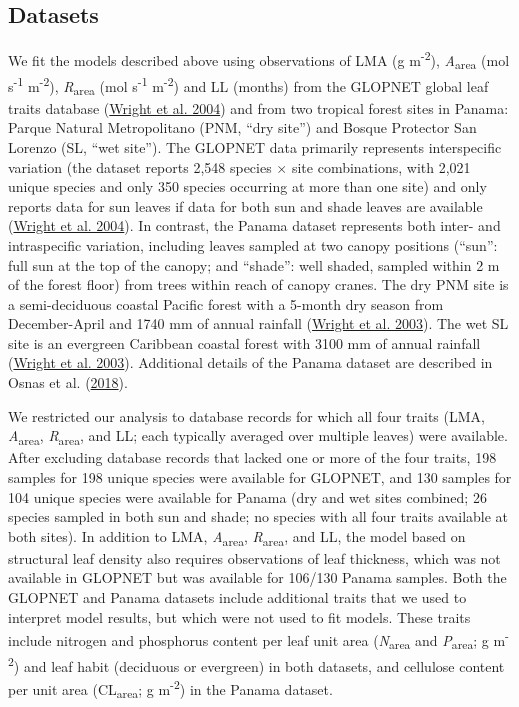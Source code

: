 \documentclass[
  12pt,
  letterpaper,
  DIV=11,
  numbers=noendperiod]{scrartcl}
\begin{document}
\hypertarget{datasets}{%
\subsection{Datasets}\label{datasets}}

We fit the models described above using observations of LMA (g
m\textsuperscript{-2}), \emph{A}\textsubscript{area} (mol
s\textsuperscript{-1} m\textsuperscript{-2}),
\emph{R}\textsubscript{area} (mol s\textsuperscript{-1}
m\textsuperscript{-2}) and LL (months) from the GLOPNET global leaf
traits database (\protect\hyperlink{ref-Wright2004a}{Wright et al.
2004}) and from two tropical forest sites in Panama: Parque Natural
Metropolitano (PNM, ``dry site'') and Bosque Protector San Lorenzo (SL,
``wet site''). The GLOPNET data primarily represents interspecific
variation (the dataset reports 2,548 species \(\times\) site
combinations, with 2,021 unique species and only 350 species occurring
at more than one site) and only reports data for sun leaves if data for
both sun and shade leaves are available
(\protect\hyperlink{ref-Wright2004a}{Wright et al. 2004}). In contrast,
the Panama dataset represents both inter- and intraspecific variation,
including leaves sampled at two canopy positions (``sun'': full sun at
the top of the canopy; and ``shade'': well shaded, sampled within 2 m of
the forest floor) from trees within reach of canopy cranes. The dry PNM
site is a semi-deciduous coastal Pacific forest with a 5-month dry
season from December-April and 1740 mm of annual rainfall
(\protect\hyperlink{ref-Wright2003}{Wright et al. 2003}). The wet SL
site is an evergreen Caribbean coastal forest with 3100 mm of annual
rainfall (\protect\hyperlink{ref-Wright2003}{Wright et al. 2003}).
Additional details of the Panama dataset are described in Osnas et al.
(\protect\hyperlink{ref-Osnas2018}{2018}).

We restricted our analysis to database records for which all four traits
(LMA, \emph{A}\textsubscript{area}, \emph{R}\textsubscript{area}, and
LL; each typically averaged over multiple leaves) were available. After
excluding database records that lacked one or more of the four traits,
198 samples for 198 unique species were available for GLOPNET, and 130
samples for 104 unique species were available for Panama (dry and wet
sites combined; 26 species sampled in both sun and shade; no species
with all four traits available at both sites). In addition to LMA,
\emph{A}\textsubscript{area}, \emph{R}\textsubscript{area}, and LL, the
model based on structural leaf density also requires observations of
leaf thickness, which was not available in GLOPNET but was available for
106/130 Panama samples. Both the GLOPNET and Panama datasets include
additional traits that we used to interpret model results, but which
were not used to fit models. These traits include nitrogen and
phosphorus content per leaf unit area (\emph{N}\textsubscript{area} and
\emph{P}\textsubscript{area}; g m\textsuperscript{-2}) and leaf habit
(deciduous or evergreen) in both datasets, and cellulose content per
unit area (CL\textsubscript{area}; g m\textsuperscript{-2}) in the
Panama dataset.
\end{document}
